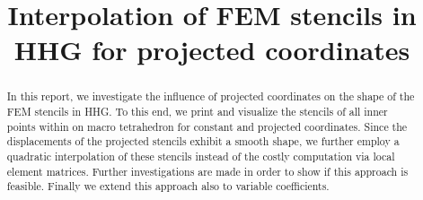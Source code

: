 \documentclass[a4paper,11pt,reqno]{amsart}
\title{Interpolation of FEM stencils in HHG for projected coordinates}
\numberwithin{figure}{section}
\numberwithin{table}{section}
\numberwithin{figure}{section}
\begin{document}
\maketitle

\begin{abstract}
In this report, we investigate the influence of projected coordinates on
the shape of the FEM stencils in HHG. To this end, we print and visualize 
the stencils of all inner points within on macro tetrahedron for constant
and projected coordinates. Since the displacements of the projected stencils
exhibit a smooth shape, we further employ a quadratic interpolation of
these stencils instead of the costly computation via local element matrices.
Further investigations are made in order to show if this approach is feasible.
Finally we extend this approach also to variable coefficients.
\end{abstract}\medskip

\end{document}

